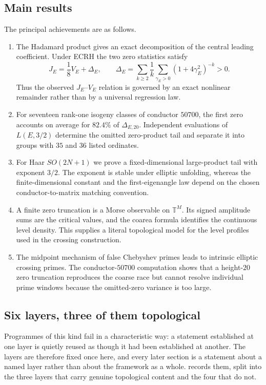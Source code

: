 \documentclass[11pt,reqno]{amsart}
\theoremstyle{remark}
\newcommand{\T}{\mathbb{T}}
\begin{document}
\subsection{Main results}
The principal achievements are as follows.
\begin{enumerate}
  \item The Hadamard product gives an exact decomposition of the central leading coefficient.  Under ECRH the two zero statistics satisfy
  \[
    J_E=\frac18V_E+\Delta_E,
    \qquad
    \Delta_E=\sum_{k\ge2}\frac1k\sum_{\gamma_E>0}(1+4\gamma_E^2)^{-k}>0.
  \]
  Thus the observed $J_E$--$V_E$ relation is governed by an exact nonlinear remainder rather than by a universal regression law.
  \item For seventeen rank-one isogeny classes of conductor $50700$, the first zero accounts on average for $82.4\%$ of $\Delta_{E,20}$.  Independent evaluations of $L(E,3/2)$ determine the omitted zero-product tail and separate it into groups with $35$ and $36$ listed ordinates.
  \item For Haar $SO(2N+1)$ we prove a fixed-dimensional large-product tail with exponent $3/2$.  The exponent is stable under elliptic unfolding, whereas the finite-dimensional constant and the first-eigenangle law depend on the chosen conductor-to-matrix matching convention.
  \item A finite zero truncation is a Morse observable on $\T^M$.  Its signed amplitude sums are the critical values, and the coarea formula identifies the continuous level density.  This supplies a literal topological model for the level profiles used in the crossing construction.
  \item The midpoint mechanism of false Chebyshev primes \cite{PlanatFalseCheb2026} leads to intrinsic elliptic crossing primes.  The conductor-$50700$ computation shows that a height-$20$ zero truncation reproduces the coarse race but cannot resolve individual prime windows because the omitted-zero variance is too large.
\end{enumerate}

\subsection{Six layers, three of them topological}
\label{subsec:layers}

Programmes of this kind fail in a characteristic way: a statement established at one layer is quietly reused as though it had been established at another.  The layers are therefore fixed once here, and every later section is a statement about a named layer rather than about the framework as a whole.   records them, split into the three layers that carry genuine topological content and the four that do not.
\end{document}
